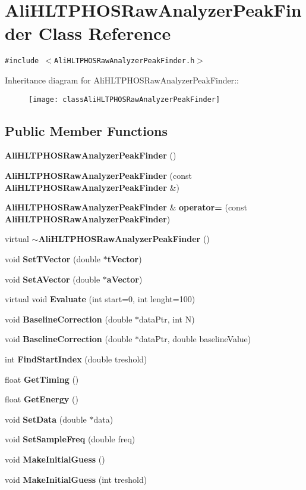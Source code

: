 \section{Ali\-HLTPHOSRaw\-Analyzer\-Peak\-Finder Class Reference}
\label{classAliHLTPHOSRawAnalyzerPeakFinder}
{\tt \#include $<$Ali\-HLTPHOSRaw\-Analyzer\-Peak\-Finder.h$>$}

Inheritance diagram for Ali\-HLTPHOSRaw\-Analyzer\-Peak\-Finder::\begin{figure}[H]
\begin{center}
\leavevmode
\texttt{[image: classAliHLTPHOSRawAnalyzerPeakFinder]}
\end{center}
\end{figure}
\subsection*{Public Member Functions}
\begin{CompactItemize}
\item 
{\bf Ali\-HLTPHOSRaw\-Analyzer\-Peak\-Finder} ()
\item 
{\bf Ali\-HLTPHOSRaw\-Analyzer\-Peak\-Finder} (const {\bf Ali\-HLTPHOSRaw\-Analyzer\-Peak\-Finder} \&)
\item 
{\bf Ali\-HLTPHOSRaw\-Analyzer\-Peak\-Finder} \& {\bf operator=} (const {\bf Ali\-HLTPHOSRaw\-Analyzer\-Peak\-Finder})
\item 
virtual {\bf $\sim$Ali\-HLTPHOSRaw\-Analyzer\-Peak\-Finder} ()
\item 
void {\bf Set\-TVector} (double $\ast${\bf t\-Vector})
\item 
void {\bf Set\-AVector} (double $\ast${\bf a\-Vector})
\item 
virtual void {\bf Evaluate} (int start=0, int lenght=100)
\item 
void {\bf Baseline\-Correction} (double $\ast$data\-Ptr, int N)
\item 
void {\bf Baseline\-Correction} (double $\ast$data\-Ptr, double baseline\-Value)
\item 
int {\bf Find\-Start\-Index} (double treshold)
\item 
float {\bf Get\-Timing} ()
\item 
float {\bf Get\-Energy} ()
\item 
void {\bf Set\-Data} (double $\ast$data)
\item 
void {\bf Set\-Sample\-Freq} (double freq)
\item 
void {\bf Make\-Initial\-Guess} ()
\item 
void {\bf Make\-Initial\-Guess} (int treshold)
\end{CompactItemize}
